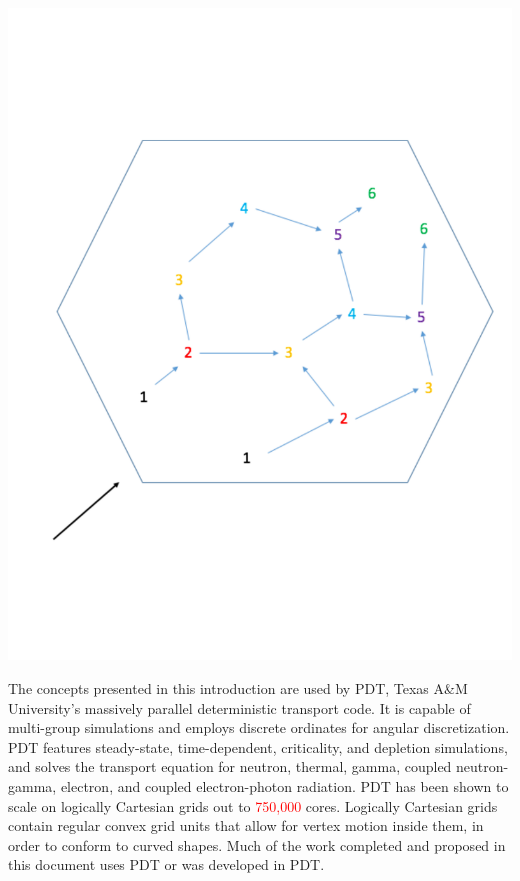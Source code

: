 \documentclass[11pt, letterpaper,titlepage,oneside]{article}
\newcommand{\tcr}[1]{\textcolor{red}{#1}}
\begin{document}
\noindent\begin{minipage}{\textwidth}
\centering
\includegraphics[scale = 0.35]{../figures/tdg.pdf}
\label{tdg}
\end{minipage}
\smallskip

The concepts presented in this introduction are used by PDT, Texas A\&M University's massively parallel deterministic transport code. It is capable of multi-group simulations and employs discrete ordinates for angular discretization. PDT features steady-state, time-dependent, criticality, and depletion simulations, and solves the transport equation for neutron, thermal, gamma, coupled neutron-gamma, electron, and coupled electron-photon radiation. PDT has been shown to scale on logically Cartesian grids out to \tcr{750,000} cores. Logically Cartesian grids contain regular convex grid units that allow for vertex motion inside them, in order to conform to curved shapes. Much of the work completed and proposed in this document uses PDT or was developed in PDT. 
\end{document}
